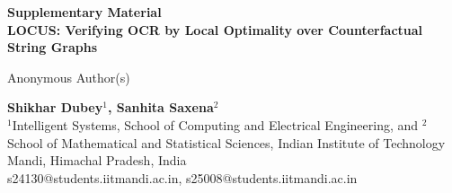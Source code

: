 \documentclass[12pt,twoside]{article}
\begin{document}
\begin{singlespace}
\begin{center}
\fontsize{20}{24}\selectfont\textbf{Supplementary Material}\\[6pt]
\fontsize{16}{20}\selectfont\textbf{LOCUS: Verifying OCR by Local Optimality over Counterfactual String Graphs}
\end{center}
\vspace{12pt}
\ifanon
\begin{center}\fontsize{12}{14}\selectfont Anonymous Author(s)\end{center}
\else
\begin{center}\fontsize{12}{14}\selectfont\textbf{Shikhar Dubey$^{1}$, Sanhita Saxena$^{2}$}\\[4pt]
\fontsize{10}{12}\selectfont $^1$Intelligent Systems, School of Computing and Electrical Engineering, and
$^2$School of Mathematical and Statistical Sciences, Indian Institute of Technology Mandi, Himachal Pradesh, India\\
s24130@students.iitmandi.ac.in, s25008@students.iitmandi.ac.in\end{center}
\fi
\end{singlespace}
\fontsize{12}{12}\selectfont
\begin{onehalfspace}

\end{onehalfspace}
\end{document}
